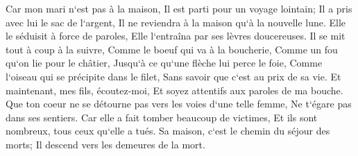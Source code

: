 \verse Car mon mari n`est pas à la maison, Il est parti pour un voyage lointain; 
\verse Il a pris avec lui le sac de l`argent, Il ne reviendra à la maison qu`à la nouvelle lune. 
\verse Elle le séduisit à force de paroles, Elle l`entraîna par ses lèvres doucereuses. 
\verse Il se mit tout à coup à la suivre, Comme le boeuf qui va à la boucherie, Comme un fou qu`on lie pour le châtier, 
\verse Jusqu`à ce qu`une flèche lui perce le foie, Comme l`oiseau qui se précipite dans le filet, Sans savoir que c`est au prix de sa vie. 
\verse Et maintenant, mes fils, écoutez-moi, Et soyez attentifs aux paroles de ma bouche. 
\verse Que ton coeur ne se détourne pas vers les voies d`une telle femme, Ne t`égare pas dans ses sentiers. 
\verse Car elle a fait tomber beaucoup de victimes, Et ils sont nombreux, tous ceux qu`elle a tués. 
\verse Sa maison, c`est le chemin du séjour des morts; Il descend vers les demeures de la mort. 


